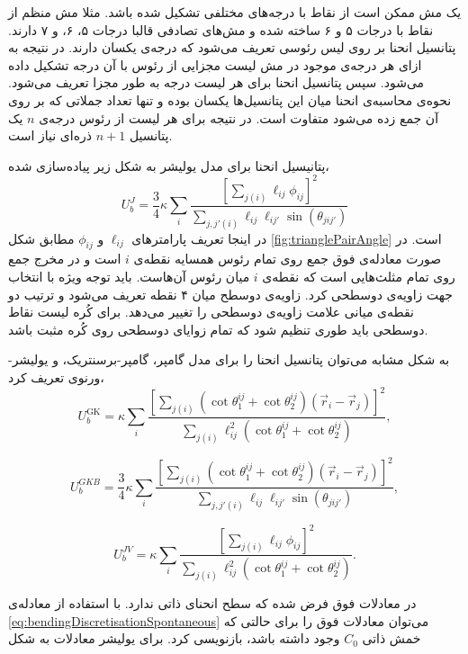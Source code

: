 یک مش ممکن است از نقاط با درجه‌های مختلفی تشکیل شده باشد. مثلا مش منظم از نقاط با درجات ۵ و ۶ ساخته شده و مش‌های تصادفی قالبا درجات ۵، ۶، و ۷ دارند. پتانسیل انحنا بر روی لیس رئوسی تعریف می‌شود که درجه‌ی یکسان دارند. در نتیجه به ازای هر درجه‌ی موجود در مش  لیست مجزایی از رئوس با آن درجه تشکیل داده می‌شود. سپس پتانسیل انحنا برای هر لیست درجه به طور مجزا تعریف می‌شود. نحوه‌ی محاسبه‌ی انحنا میان این پتانسیل‌ها یکسان بوده و تنها تعداد جملاتی که بر روی آن جمع زده می‌شود متفاوت است. در نتیجه برای هر لیست از رئوس درجه‌ی 
$n$
یک پتانسیل 
$n+1$
ذره‌ای نیاز است.


پتانیسیل  انحنا برای مدل یولیشر به شکل زیر پیاده‌سازی شده،
\begin{equation}
U_b^J=\frac{3}{4}\kappa\sum_i\frac{\left[\sum_{j(i)}\ell_{ij}\phi_{ij}\right]^2}{\sum_{j,j'(i)}\ell_{ij}\ell_{ij'}\sin(\theta_{jij'})}
\end{equation}
در اینجا تعریف پارامتر‌های 
$\ell_{ij}$
و
$\phi_{ij}$
مطابق شکل 
\ref{fig:trianglePairAngle}
است. در صورت معادله‌ی فوق جمع روی تمام رئوس همسایه نقطه‌ی 
$i$
است و در مخرج جمع روی تمام مثلث‌هایی است که نقطه‌ی 
$i$
میان رئوس آن‌هاست. باید توجه ویژه با انتخاب جهت زاویه‌ی دوسطحی کرد. زاویه‌ی دوسطح میان ۴ نقطه تعریف می‌شود و ترتیب دو نقطه‌ی میانی علامت زاویه‌ی دوسطحی را تغییر می‌دهد. برای کُره لیست نقاط دوسطحی باید طوری تنظیم شود که تمام زوایای دوسطحی روی کُره مثبت باشد.

به شکل مشابه می‌توان پتانسیل انحنا را برای مدل گامپر، گامپر-برسنتریک، و یولیشر-ورنوی تعریف کرد،
\begin{equation}
U_b^\text{GK}=\kappa\sum_i\frac{\left[\sum_{j(i)}(\cot\theta_1^{ij}+\cot\theta_2^{ij})(\vec r_i-\vec r_j)\right]^2}{\sum_{j(i)}\ell_{ij}^2(\cot\theta_1^{ij}+\cot\theta_2^{ij})},
\end{equation}

\begin{equation}
U_b^{GKB}=\frac{3}{4}\kappa\sum_i\frac{\left[\sum_{j(i)}(\cot\theta_1^{ij}+\cot\theta_2^{ij})(\vec r_i-\vec r_j)\right]^2}{\sum_{j,j'(i)}\ell_{ij}\ell_{ij'}\sin(\theta_{jij'})},
\end{equation}

\begin{equation}
U_b^{JV}=\kappa\sum_i\frac{\left[\sum_{j(i)}\ell_{ij}\phi_{ij}\right]^2}{\sum_{j(i)}\ell_{ij}^2(\cot\theta_1^{ij}+\cot\theta_2^{ij})}.
\end{equation}

در معادلات فوق فرض شده که سطح انحنای ذاتی ندارد. با استفاده از معادله‌ی 
\ref{eq:bendingDiscretisationSpontaneous}
می‌توان معادلات فوق را برای حالتی که خمش ذاتی 
$C_0$
وجود داشته باشد، بازنویسی کرد. برای یولیشر معادلات به شکل


